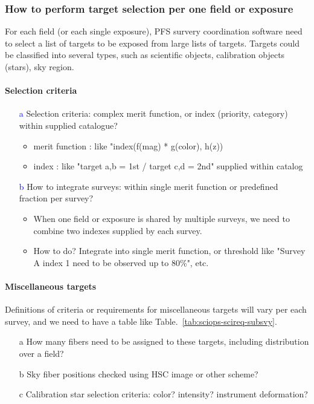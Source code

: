 \documentclass[a4paper,notitlepage]{article}
\newcommand{\coll}[1]{\textcolor{blue}{#1}}
\begin{document}
\subsubsection{How to perform target selection per one field or exposure}

For each field (or each single exposure), PFS survery coordination software 
need to select a list of targets to be exposed from large lists of targets. 
Targets could be classified into several types, such as scientific objects, 
calibration objects (stars), sky region. 

\paragraph{Selection criteria}

\begin{enumerate}
  \item[\coll{a}] Selection criteria: complex merit function, or index (priority, 
    category) within supplied catalogue?
    \begin{itemize}
      \item merit function : like "index(f(mag) * g(color), h(z))
      \item index : like "target a,b = 1st / target c,d = 2nd" supplied within 
        catalog
    \end{itemize}
  \item[\coll{b}] How to integrate surveys: within single merit function or predefined 
    fraction per survey?
    \begin{itemize}
      \item When one field or exposure is shared by multiple surveys, we need 
        to combine two indexes supplied by each survey.
      \item How to do? Integrate into single merit function, or threshold like 
        "Survey A index 1 need to be observed up to 80\%", etc.
    \end{itemize}
\end{enumerate}

\paragraph{Miscellaneous targets}

Definitions of criteria or requirements for miscellaneous targets will 
vary per each survey, and we need to have a table like 
Table.~\ref{tab:sciops-scireq-subsvy}. 

\begin{enumerate}
  \item[a] How many fibers need to be assigned to these targets, including 
    distribution over a field? 
  \item[b] Sky fiber positions checked using HSC image or other scheme?
  \item[c] Calibration star selection criteria: color? intensity? instrument deformation?
\end{enumerate}
\end{document}
